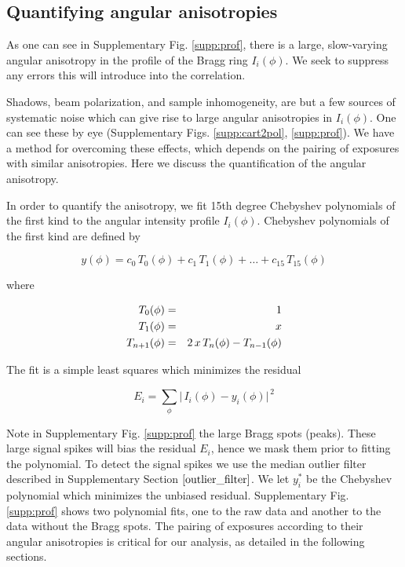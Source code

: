 \documentclass [12pt,fleqn]{article}
\begin{document}
\subsection{Quantifying angular anisotropies}
As one can see in Supplementary Fig. \ref{supp:prof}, there is a large, slow-varying angular anisotropy in the profile of the Bragg ring $I_i(\phi)$. We seek to suppress any errors this will introduce into the correlation. 

Shadows, beam polarization, and sample inhomogeneity, are but a few sources of systematic noise which can give rise to large angular anisotropies in $I_i(\phi)$. One can see these by eye (Supplementary Figs. \ref{supp:cart2pol}, \ref{supp:prof}). We have a method for overcoming these effects, which depends on the pairing of exposures with similar anisotropies. Here we discuss the quantification of the angular anisotropy.

In order to quantify the anisotropy, we fit 15th degree Chebyshev polynomials of the first kind to the angular intensity profile $I_i(\phi)$. Chebyshev polynomials of the first kind are defined by

\begin{equation}
y(\phi) = c_0\,T_0(\phi) + c_1\,T_1(\phi) + \dots + c_{15} \, T_{15}(\phi) 
\end{equation}

where

\begin{eqnarray}
T_0(\phi) &=& 1 \nonumber\cr
T_1(\phi) &=& x \nonumber \cr
T_{n+1}(\phi) &=& 2\,x\,T_n(\phi) - T_{n-1}(\phi) \nonumber
\end{eqnarray}

The fit is a simple least squares which minimizes the residual

\begin{equation} \label{supp:fit}
E_i =  \sum_{\phi} \big |\, I_i(\phi) - y_i(\phi)\big |^{\,2}
\end{equation}

Note in Supplementary Fig. \ref{supp:prof} the large Bragg spots (peaks). These large signal spikes will bias the residual $E_i$, hence we mask them prior to fitting the polynomial. To detect the signal spikes we use the median outlier filter described in Supplementary Section $\ref{outlier_filter}$. We let $y^*_i$ be the Chebyshev polynomial which minimizes the unbiased residual. Supplementary Fig. \ref{supp:prof} shows two polynomial fits, one to the raw data and another to the data without the Bragg spots. The pairing of exposures according to their angular anisotropies is critical for our analysis, as detailed in the following sections.
\end{document}
